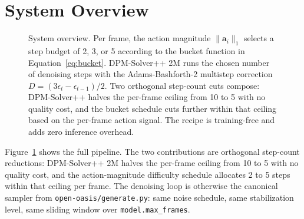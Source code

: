 \documentclass[10pt,letterpaper,twocolumn]{article}
\begin{document}
\section{System Overview}

\begin{figure}[t]
\centering
{}
\caption{System overview. Per frame, the action magnitude $\|\mathbf{a}_i\|_1$ selects a step budget of 2, 3, or 5 according to the bucket function in Equation~\ref{eq:bucket}. DPM-Solver++ 2M runs the chosen number of denoising steps with the Adams-Bashforth-2 multistep correction $D = (3\epsilon_t - \epsilon_{t-1})/2$. Two orthogonal step-count cuts compose: DPM-Solver++ halves the per-frame ceiling from 10 to 5 with no quality cost, and the bucket schedule cuts further within that ceiling based on the per-frame action signal. The recipe is training-free and adds zero inference overhead.}
\label{fig:overview}
\end{figure}

Figure~\ref{fig:overview} shows the full pipeline. The two contributions are orthogonal step-count reductions: DPM-Solver++ 2M halves the per-frame ceiling from 10 to 5 with no quality cost, and the action-magnitude difficulty schedule allocates 2 to 5 steps within that ceiling per frame. The denoising loop is otherwise the canonical sampler from \texttt{open-oasis/generate.py}: same noise schedule, same stabilization level, same sliding window over \texttt{model.max\_frames}.
\end{document}
